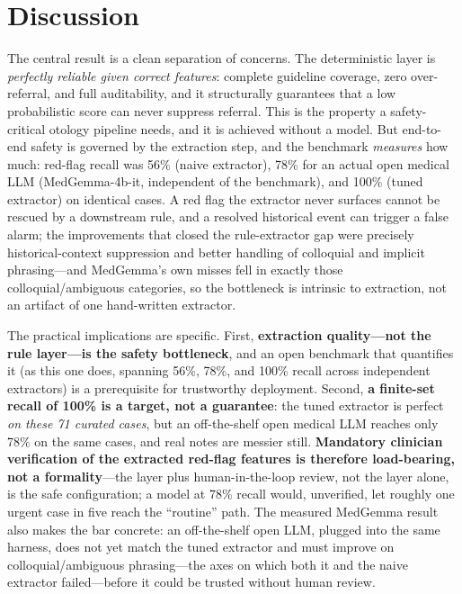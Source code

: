 \documentclass[11pt]{article}
\begin{document}
\section{Discussion}
The central result is a clean separation of concerns. The deterministic layer is \emph{perfectly reliable given correct features}: complete guideline coverage, zero over-referral, and full auditability, and it structurally guarantees that a low probabilistic score can never suppress referral. This is the property a safety-critical otology pipeline needs, and it is achieved without a model. But end-to-end safety is governed by the extraction step, and the benchmark \emph{measures} how much: red-flag recall was 56\% (naive extractor), 78\% for an actual open medical LLM (MedGemma-4b-it, independent of the benchmark), and 100\% (tuned extractor) on identical cases. A red flag the extractor never surfaces cannot be rescued by a downstream rule, and a resolved historical event can trigger a false alarm; the improvements that closed the rule-extractor gap were precisely historical-context suppression and better handling of colloquial and implicit phrasing---and MedGemma's own misses fell in exactly those colloquial/ambiguous categories, so the bottleneck is intrinsic to extraction, not an artifact of one hand-written extractor.

The practical implications are specific. First, \textbf{extraction quality---not the rule layer---is the safety bottleneck}, and an open benchmark that quantifies it (as this one does, spanning 56\%, 78\%, and 100\% recall across independent extractors) is a prerequisite for trustworthy deployment. Second, \textbf{a finite-set recall of 100\% is a target, not a guarantee}: the tuned extractor is perfect \emph{on these 71 curated cases}, but an off-the-shelf open medical LLM reaches only 78\% on the same cases, and real notes are messier still. \textbf{Mandatory clinician verification of the extracted red-flag features is therefore load-bearing, not a formality}---the layer plus human-in-the-loop review, not the layer alone, is the safe configuration; a model at 78\% recall would, unverified, let roughly one urgent case in five reach the ``routine'' path. The measured MedGemma result also makes the bar concrete: an off-the-shelf open LLM, plugged into the same harness, does not yet match the tuned extractor and must improve on colloquial/ambiguous phrasing---the axes on which both it and the naive extractor failed---before it could be trusted without human review.
\end{document}
